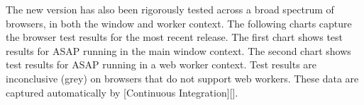 The new version has also been rigorously tested across a broad spectrum of browsers, in both the window and worker context. The following charts capture the browser test results for the most recent release. The first chart shows test results for A\+S\+AP running in the main window context. The second chart shows test results for A\+S\+AP running in a web worker context. Test results are inconclusive (grey) on browsers that do not support web workers. These data are captured automatically by \mbox{[}Continuous Integration\mbox{]}\mbox{[}\mbox{]}.



 